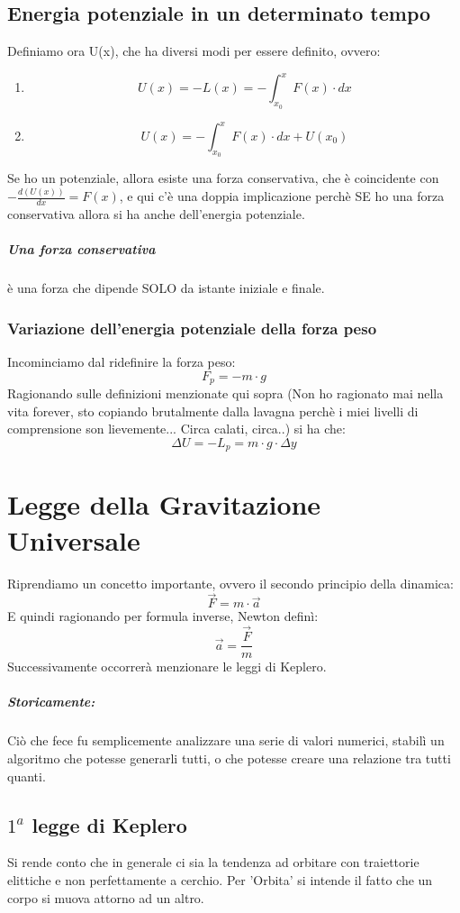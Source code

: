 \documentclass[12pt, a4paper, openany, oneside]{book}
\begin{document}
\section{Energia potenziale in un determinato tempo}
Definiamo ora U(x), che ha diversi modi per essere definito, ovvero:
\begin{enumerate}
	\item \[
	U(x) = -L(x) = - \int_{x_{0}}^{x}  F(x) \cdot dx
	\]
	\item \[
	U(x) = - \int_{x_{0}}^{x}  F(x) \cdot dx + U(x_{0})
	\]
\end{enumerate}
Se ho un potenziale, allora esiste una forza conservativa, che è coincidente
con $- \frac{d(U(x))}{dx} = F(x)$, e qui c'è una doppia implicazione perchè SE
ho una forza conservativa allora si ha anche dell'energia potenziale.
\paragraph{Una forza conservativa } è una forza che dipende SOLO da istante 
iniziale e finale.
\subsection{Variazione dell'energia potenziale della forza peso}
Incominciamo dal ridefinire la forza peso:
\[
F_{p} = -m\cdot g
\]
Ragionando sulle definizioni menzionate qui sopra (Non ho ragionato mai nella
vita forever, sto copiando brutalmente dalla lavagna perchè i miei livelli
di comprensione son lievemente... Circa calati, circa..) si ha che:
\[
\Delta U = -L_{p} = m\cdot g \cdot \Delta y
\]
\chapter{Legge della Gravitazione Universale}
\label{LeggeGrav}
Riprendiamo un concetto importante, ovvero il secondo principio della dinamica:
\[
\overrightarrow{F} = m \cdot \overrightarrow{a}
\]
E quindi ragionando per formula inverse, Newton definì:
\[
\overrightarrow{a} = \frac{\overrightarrow{F}}{m}
\]
Successivamente occorrerà menzionare le leggi di Keplero.
\paragraph{Storicamente: }Ciò che fece fu semplicemente analizzare una serie di
valori numerici, stabilì un algoritmo che potesse generarli tutti, o che potesse
creare una relazione tra tutti quanti. 
\section{$1^{a}$ legge di Keplero}
Si rende conto che in generale ci sia la tendenza ad orbitare con traiettorie
elittiche e non perfettamente a cerchio. Per 'Orbita' si intende il fatto che 
un corpo si muova attorno ad un altro.
\end{document}
